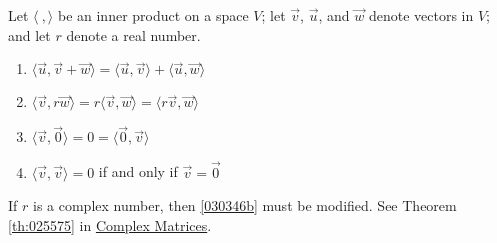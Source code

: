 \documentclass{ximera}
\begin{document}
\begin{theorem}\label{thm:030346}
Let $\langle\ , \rangle$ be an inner product on a space $V$; let $\vec{v}$, $\vec{u}$, and $\vec{w}$ denote vectors in $V$; and let $r$ denote a real number.

\begin{enumerate}
\item\label{030346a} $\langle \vec{u}, \vec{v} + \vec{w}\rangle =
  \langle\vec{u}, \vec{v}\rangle + \langle\vec{u}, \vec{w}\rangle$

\item\label{030346b} $\langle\vec{v}, r\vec{w}\rangle =  r\langle\vec{v}, \vec{w}\rangle = \langle r\vec{v}, \vec{w}\rangle$

\item\label{030346c} $\langle\vec{v}, \vec{0}\rangle = 0 = \langle\vec{0}, \vec{v} \rangle $

\item\label{030346d} $\langle\vec{v}, \vec{v}\rangle = 0$ if and only if $\vec{v} = \vec{0}$

\end{enumerate}
\end{theorem}

\begin{remark}
    If $r$ is a complex number, then \ref{030346b} must be modified.  See Theorem \ref{th:025575} in \href{https://ximera.osu.edu/linearalgebradzv3/LinearAlgebraInteractiveIntro/RTH-0050/main}{Complex Matrices}.
\end{remark}
\end{document}
